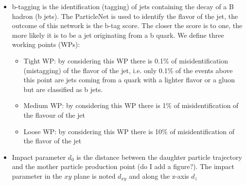 \begin{itemize}
    \item b-tagging is the identification (tagging) of jets containing the decay of a B hadron (b jets). The ParticleNet is used to identify the flavor of the jet, the outcome of this network is the b-tag score. The closer the score is to one, the more likely it is to be a jet originating from a b quark. We define three working points (WPs):
    \begin{itemize}
        \item Tight WP: by considering this WP there is 0.1\% of misidentification (mistagging) of the flavor of the jet, i.e. only 0.1\% of the events above this point are jets coming from a quark with a lighter flavor or a gluon but are classified as b jets.
        \item Medium WP: by considering this WP there is 1\% of misidentification of the flavour of the jet
        \item Loose WP: by considering this WP there is 10\% of misidentification of the flavor of the jet
    \end{itemize}
    \item Impact parameter $d_0$ is the distance between the daughter particle trajectory and the mother particle production point (do I add a figure?). The impact parameter in the $xy$ plane is noted $d_{xy}$ and along the z-axis $d_z$
\end{itemize}



